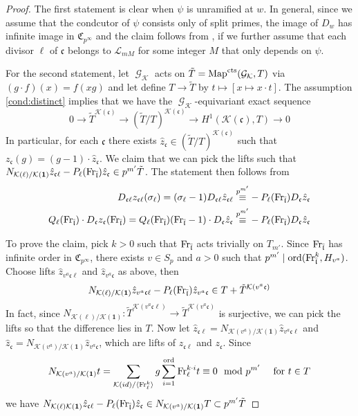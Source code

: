 \documentclass[leqno]{amsart}
\theoremstyle{definition}
\theoremstyle{remark}
\newcommand{\id}{\mathbf{1}}
\DeclareMathOperator{\Gal}{\mathcal{G}}
\newcommand{\Fr}{\textnormal{Fr}} %
\newcommand{\cts}{\textnormal{cts}}
\newcommand{\fc}{\mathfrak{c}}
\newcommand{\fl}{\mathfrak{l}}
\newcommand{\K}{{\mathcal{K}}} %
\newcommand{\flw}{\bar{\fl}}
\newcommand{\rp}[1]{\mathfrak{C}_{#1}} %
\newcommand{\rs}[1]{H_{#1}} %
\newcommand{\rk}[1]{\K({#1})} %
\newcommand{\ord}{\textnormal{ord}} %
\begin{document}
\begin{proof}
The first statement is clear when 
$\psi$ is unramified at $w$.
In general, since we assume
that the condcutor of $\psi$ consists
only of split primes, the 
image of $D_w$ has infinite image in  $\rp{p^\infty}$
and the claim follows from
\cite[Cor 4.6.5]{Rubin},
if we further assume that
each divisor $\ell$ of $\fc$
belongs to  $\mathcal{L}_{mM}$ 
for some integer $M$ that only depends on  $\psi$.

For the second statement, 
let $\Gal_\K$ acts on $\tilde{T}=\text{Map}^{\cts}(\Gal_\K,T)$
via $(g\cdot f)(x)=f(xg)$ and 
let define $T\to\tilde{T}$ by
$t\mapsto [x\mapsto x\cdot t]$.
The assumption \eqref{cond:distinct} implies that
we have the $\Gal_\K$-equivariant 
exact sequence
\[
	0\to\tilde{T}^{\rk{\fc}}\to (\tilde{T}/T)^{\rk{\fc}}\to 
	H^1(\rk{\fc},T)\to 0
\]
In particular, for each $\fc$
there exists $ \hat{z}_\fc\in (\tilde{T}/T)^{\rk{\fc}}$
such that $z_\fc(g)=(g-1)\cdot \hat{z}_\fc$.
We claim that we can pick the lifts such that
$N_{\rk{\ell}/\rk{\id}}\hat{z}_{\fc\ell}-P_\ell(\Fr_{\flw})
\hat{z}_{\fc}\in p^{m'}\tilde{T}$.
The statement then follows from 
\begin{align*}
	D_{\fc\ell}z_{\fc\ell}(\sigma_\ell)=
	(\sigma_\ell-1)D_{\fc\ell}\hat{z}_{\fc\ell}
	\overset{p^{m'}}{\equiv}&
	-P_\ell(\Fr_{\flw}) D_\fc \hat{z}_\fc\\
	Q_\ell(\Fr_{\flw})\cdot
	D_\fc z_\fc(\Fr_{\flw})=
	Q_\ell(\Fr_{\flw})(\Fr_{\flw}-1)
	\cdot D_\fc \hat{z}_\fc
	\overset{p^{m'}}{\equiv}&
	-P_\ell(\Fr_{\flw}) D_\fc \hat{z}_\fc
\end{align*}

To prove the claim,
pick $k>0$ such that 
$\Fr_{\flw}$ acts trivially on $T_{m'}$.
Since $\Fr_{\flw}$ has infinite order
in $\rp{p^\infty}$,
there exists  $v\in S_p$ and  $a>0$
such that
$p^{m'}\mid \ord(\Fr_{\flw}^k, \rs{v^a})$.
Choose lifts
$\hat{z}_{v^a\fc\ell}$ and $ \hat{z}_{v^a\fc}$
as above, then
\[
	N_{\rk{\ell}/\rk{\id}}
	\hat{z}_{v^a\fc\ell}-P_\ell(\Fr_{\flw})
	\hat{z}_{v^a\fc}\in T+\tilde{T}^{\rk{v^a\fc}}
\]
In fact, since 
$N_{\rk{\ell}/\rk{\id}}\colon\tilde{T}^{\rk{v^a\fc\ell}}\to
\tilde{T}^{\rk{v^a\fc}}$ 
is surjective,
we can pick the lifts so that the difference
lies in $T$.
Now let 
$\hat{z}_{\fc\ell}=N_{\rk{v^a}/\rk{\id}}
\hat{z}_{v^a\fc\ell}$ and
$\hat{z}_{\fc}=N_{\rk{v^a}/\rk{\id}}\hat{z}_{v^a\fc}$,
which are lifts of $z_{\fc\ell}$ and $z_{\fc}$.
Since
\[
	N_{\rk{v^a}/\rk{\id}}t=
	\sum_{\rk{id}/\langle \Fr_\ell^k\rangle}g
	\sum_{i=1}^{\ord}\Fr_\ell^{k\cdot i} t\equiv 0
	\mod p^{m'}\quad
	\text{ for } t\in T
\]
we have 
$N_{\rk{\ell}\rk{\id}}\hat{z}_{\fc\ell}-P_\ell(\Fr_{\flw})
\hat{z}_{\fc}\in N_{\rk{v^a}/\rk{\id}}T\subset p^{m'}\tilde{T}$
\end{proof}
\end{document}

